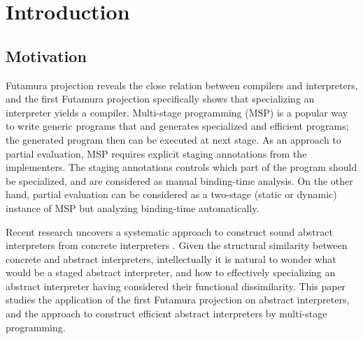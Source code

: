 \section{Introduction}

\subsection{Motivation}

Futamura projection \cite{Futamura1999, futamura1971partial} reveals the close relation between 
compilers and interpreters, 
and the first Futamura projection specifically shows that specializing an interpreter yields a compiler. 
Multi-stage programming (MSP) \cite{taha1999multi, DBLP:conf/pepm/TahaS97} is a popular way to write 
generic programs that and generates specialized and efficient programs; 
the generated program then can be executed at next stage. 
As an approach to partial evaluation, MSP requires explicit staging annotations from the implementers.
The staging annotations controls which part of the program should be specialized, and are considered 
as manual binding-time analysis. On the other hand, partial evaluation \cite{DBLP:books/daglib/0072559} 
can be considered as a two-stage (static or dynamic) instance of MSP but analyzing binding-time automatically.

Recent research uncovers a systematic approach to construct sound abstract interpreters 
from concrete interpreters \cite{DBLP:journals/jfp/HornM12, DBLP:conf/icfp/HornM10, DBLP:journals/pacmpl/DaraisLNH17}.
Given the structural similarity between concrete and abstract interpreters, intellectually 
it is natural to wonder what would be a staged abstract interpreter, and how to effectively 
specializing an abstract interpreter having considered their functional dissimilarity. 
This paper studies the application of the first Futamura projection on abstract interpreters, 
and the approach to construct efficient abstract interpreters by multi-stage programming.

